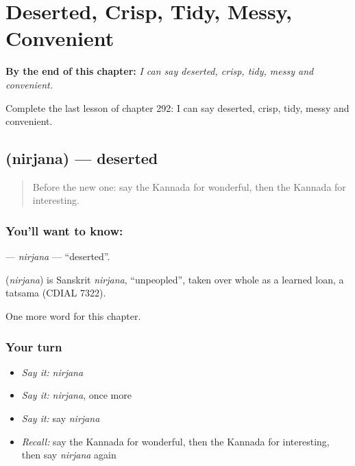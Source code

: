 
\chapter{Deserted, Crisp, Tidy, Messy, Convenient}
\label{ch:ka-deserted-crisp-tidy-messy-convenient}

\begin{chapteropening}
\textbf{By the end of this chapter:} \emph{I can say deserted, crisp, tidy, messy and convenient.}

Complete the last lesson of chapter 292: I can say deserted, crisp, tidy, messy and convenient.
\end{chapteropening}

\section[\texorpdfstring{\kn{ನಿರ್ಜನ} (nirjana)}{ನಿರ್ಜನ (nirjana)}]{ (nirjana) — deserted}

\label{lesson:KA-C292-nirjana}



\begin{quote}
Before the new one: say the Kannada for wonderful, then the Kannada for interesting.
\end{quote}

\subsection*{You'll want to know: }
\textbf{} — \emph{nirjana} — \textquotedblleft{}deserted\textquotedblright{}.

\begin{cousinweb}
\textbf{} (\emph{nirjana}) is Sanskrit \emph{nirjana}, \textquotedblleft{}unpeopled\textquotedblright{}, taken over whole as a learned loan, a tatsama (CDIAL 7322).
\end{cousinweb}

\begin{grammarlens}[title={What you've built}]
One more word for this chapter.
\end{grammarlens}

\subsection*{Your turn}
\begin{itemize}
\raggedright
  \item \emph{Say it:} \emph{nirjana}
  \item \emph{Say it:} \emph{nirjana}, once more
  \item \emph{Say it:} say \emph{nirjana}
  \item \emph{Recall:} say the Kannada for wonderful, then the Kannada for interesting, then say \emph{nirjana} again
\end{itemize}

